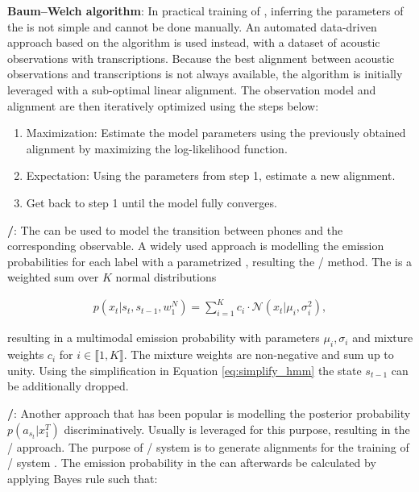 \textbf{Baum–Welch algorithm}: In practical training of , inferring the parameters of the  is not simple and cannot be done manually.
An automated data-driven approach based on the  algorithm is used instead, with a dataset of acoustic observations with transcriptions.
Because the best alignment between acoustic observations and transcriptions is not always available, the  algorithm is initially leveraged with a sub-optimal linear alignment.
The observation model and alignment are then iteratively optimized using the steps below:

\begin{enumerate}
	\item Maximization: Estimate the model parameters using the previously obtained alignment by maximizing the log-likelihood function.
	\item Expectation: Using the parameters from step 1, estimate a new alignment.  
	\item Get back to step 1 until the model fully converges.
\end{enumerate}

\textbf{/}: The  can be used to model the transition between phones and the corresponding observable.
A widely used approach is modelling the emission probabilities for each label with a parametrized , resulting the / method.
The  is a weighted sum over $K$ normal distributions

\begin{align}
	p(x_t|s_t, s_{t-1}, w_1^N) = \sum_{i=1}^K c_i \cdot \mathcal{N}(x_t|\mu_i, \sigma_i^2),
\end{align}

resulting in a multimodal emission probability with
parameters $\mu_i, \sigma_i$ and mixture weights $c_i$ 
for $i\in\llbracket1,K\rrbracket$. 
The mixture weights are non-negative and sum up to unity.
Using the simplification in Equation \ref{eq:simplify_hmm} the state $s_{t-1}$ can be additionally dropped. 

\textbf{/}: Another approach that has been popular is modelling the posterior probability $p(a_{s_t}|x_1^T)$ discriminatively.
Usually  is leveraged for this purpose, resulting in the / approach.
The purpose of / system is to generate alignments for the training of / system \cite{RASR-hybrid_vs_attention}.
The emission probability in the  can afterwards be calculated by applying Bayes rule such that:

